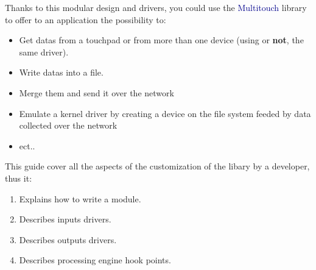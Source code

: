 Thanks to this modular design and drivers, you could use the 
\textcolor{darkblue}{Multitouch} library to offer to an application 
the possibility to:
\begin{itemize}
\item Get datas from a touchpad or from more than one device (using or 
\textbf{not}, the same driver).
\item Write datas into a file.
\item Merge them and send it over the network
\item Emulate a kernel driver by creating a device on the file system feeded 
by data collected over the network
\item ect..
\end{itemize}

This guide cover all the aspects of the customization of the libary by a
developer, thus it:
\begin{enumerate}
\item Explains how to write a module.
\item Describes inputs drivers. 
\item Describes outputs drivers. 
\item Describes processing engine hook points. 
\end{enumerate}

